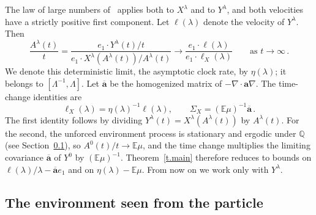 \documentclass[11pt]{amsart}
\theoremstyle{definition}
\theoremstyle{remark}
\numberwithin{equation}{section}
\newcommand{\E}{\mathbb E}
\newcommand{\Q}{\mathbb Q}
\renewcommand{\a}{\mathbf a}
\newcommand{\ahom}{\overline{\mathbf a}}
\begin{document}
The law of large numbers of~\citet[Section~5]{Einstein2012gantert} applies both to $X^\lambda$ and to $Y^\lambda$, and both velocities have a strictly positive first component. Let $\ell(\lambda)$ denote the velocity of $Y^\lambda$. Then
\begin{equation*}
 \frac{A^\lambda(t)}t
 =\frac{e_1\cdot Y^\lambda(t)/t}
 {e_1\cdot X^\lambda(A^\lambda(t))/A^\lambda(t)}
 \longrightarrow\frac{e_1\cdot\ell(\lambda)}{e_1\cdot\ell_X(\lambda)}
 \qquad\text{as }t\to\infty\, .
\end{equation*}
We denote this deterministic limit, the asymptotic clock rate, by $\eta(\lambda)$; it belongs to $[\Lambda^{-1},\Lambda]$. Let $\ahom$ be the homogenized matrix of $-\nabla\cdot\a\nabla$. The time-change identities are
\begin{equation}\label{eq.time-change-identities}
 \ell_X(\lambda)=\eta(\lambda)^{-1}\ell(\lambda),
 \qquad \Sigma_X=(\E\mu)^{-1}\ahom\, .
\end{equation}
The first identity follows by dividing $Y^\lambda(t)=X^\lambda(A^\lambda(t))$ by $A^\lambda(t)$. For the second, the unforced environment process is stationary and ergodic under $\Q$ (see Section~\ref{ss.environment}), so $A^0(t)/t\to\E\mu$, and the time change multiplies the limiting covariance $\ahom$ of $Y^0$ by $(\E\mu)^{-1}$. Theorem~\ref{t.main} therefore reduces to bounds on $\ell(\lambda)/\lambda-\ahom e_1$ and on $\eta(\lambda)-\E\mu$. From now on we work only with $Y^\lambda$.

\subsection{The environment seen from the particle}\label{ss.environment}
\end{document}
